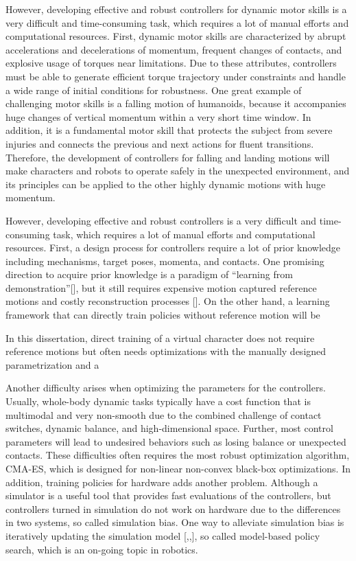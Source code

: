However, developing effective and robust controllers for dynamic motor skills 
is a very difficult and time-consuming task, which requires a lot of manual
efforts and computational resources.
First, dynamic motor skills are 
characterized by abrupt accelerations and decelerations of momentum,
frequent changes of contacts, and explosive usage of torques near limitations.
Due to these attributes, controllers must be able to generate efficient
torque trajectory under constraints and handle a wide range of initial
conditions for robustness.
One great example of challenging motor skills is a falling motion
of humanoids, because it accompanies huge changes of vertical momentum within 
a very short time window.
In addition, it is a fundamental motor skill that protects the subject from 
severe injuries and connects the previous and next actions for fluent
transitions.
Therefore, the development of controllers for falling and landing motions
will make characters and robots to operate safely in the unexpected environment,
and its principles can be applied to the other highly dynamic motions
with huge momentum.

However, developing effective and robust controllers is a very difficult and
time-consuming task, which requires a lot of manual efforts and computational
resources.
First, a design process for controllers require a lot of prior knowledge
including mechanisms, target poses, momenta, and contacts.
One promising direction to acquire prior knowledge is a paradigm of
``learning from demonstration''[], but it still requires expensive motion
captured reference motions and costly reconstruction processes [].
On the other hand, a learning framework that can directly train policies
without reference motion will be 

In this dissertation, direct training of a virtual character does not require 
reference motions but often needs optimizations with the manually
designed parametrization and a

Another difficulty arises when optimizing the parameters for the controllers.
Usually, whole-body dynamic tasks typically have a cost function that is 
multimodal and very non-smooth due to the combined challenge of contact 
switches, dynamic balance, and high-dimensional space.
Further, most control parameters will lead to undesired behaviors such as
losing balance or unexpected contacts.
These difficulties often requires the most robust optimization algorithm, 
CMA-ES, which is designed for non-linear non-convex black-box
optimizations.
In addition, training policies for hardware adds another problem.
Although a simulator is a useful tool that provides fast evaluations of the
controllers, but controllers turned in simulation do not work on hardware due
to the differences in two systems, so called simulation bias.
One way to alleviate simulation bias is iteratively updating the simulation
model [,,], so called model-based policy search, which is an on-going topic in
robotics.


